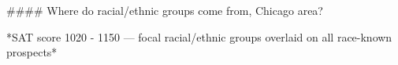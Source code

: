 #### Where do racial/ethnic groups come from, Chicago area?

*SAT score 1020 - 1150 — focal racial/ethnic groups overlaid on all race-known prospects*
